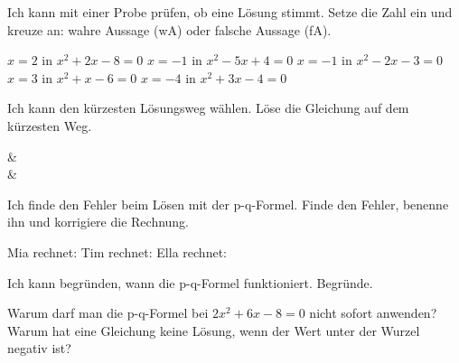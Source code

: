 \begin{aufgabe}{Ich kann mit einer Probe prüfen, ob eine Lösung stimmt.}
Setze die Zahl ein und kreuze an: wahre Aussage (wA) oder falsche Aussage (fA).
\begin{teile}
\teil $x = 2$ \quad in \quad $x^2 + 2x - 8 = 0$ \hfill {} 
\teil $x = -1$ \quad in \quad $x^2 - 5x + 4 = 0$ \hfill {} 
\teil $x = -1$ \quad in \quad $x^2 - 2x - 3 = 0$ \hfill {} 
\teil $x = 3$ \quad in \quad $x^2 + x - 6 = 0$ \hfill {} 
\teil $x = -4$ \quad in \quad $x^2 + 3x - 4 = 0$ \hfill {} 
\end{teile}
\end{aufgabe}

\begin{aufgabe}{Ich kann den kürzesten Lösungsweg wählen.}
Löse die Gleichung auf dem kürzesten Weg.
\begin{gleichungsraster}[3]
 &  \\
 &  \\
\end{gleichungsraster}
\end{aufgabe}

\begin{aufgabe}{Ich finde den Fehler beim Lösen mit der p-q-Formel.}
Finde den Fehler, benenne ihn und korrigiere die Rechnung.
\begin{teile}
\teil Mia rechnet: 
\teil Tim rechnet: 
\teil Ella rechnet: 
\end{teile}
\end{aufgabe}

\begin{aufgabe}{Ich kann begründen, wann die p-q-Formel funktioniert.}
Begründe.
\begin{teile}
\teil Warum darf man die p-q-Formel bei $2x^2 + 6x - 8 = 0$ nicht sofort anwenden?
\teil Warum hat eine Gleichung keine Lösung, wenn der Wert unter der Wurzel negativ ist?
\end{teile}
\end{aufgabe}

